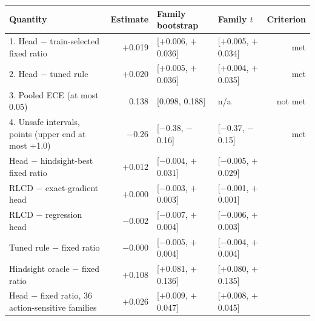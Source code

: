 \begin{tabular}{lrllr}
\toprule
Quantity & Estimate & Family bootstrap & Family $t$ & Criterion \\
\midrule
1. Head $-$ train-selected fixed ratio & $+$0.019 & [$+$0.006, $+$0.036] & [$+$0.005, $+$0.034] & met \\
2. Head $-$ tuned rule & $+$0.020 & [$+$0.005, $+$0.036] & [$+$0.004, $+$0.035] & met \\
3. Pooled ECE (at most 0.05) & 0.138 & [0.098, 0.188] & n/a & not met \\
4. Unsafe intervals, points (upper end at most $+$1.0) & $-$0.26 & [$-$0.38, $-$0.16] & [$-$0.37, $-$0.15] & met \\
\midrule
Head $-$ hindsight-best fixed ratio & $+$0.012 & [$-$0.004, $+$0.031] & [$-$0.005, $+$0.029] &  \\
RLCD $-$ exact-gradient head & $+$0.000 & [$-$0.003, $+$0.003] & [$-$0.001, $+$0.001] &  \\
RLCD $-$ regression head & $-$0.002 & [$-$0.007, $+$0.004] & [$-$0.006, $+$0.003] &  \\
Tuned rule $-$ fixed ratio & $-$0.000 & [$-$0.005, $+$0.004] & [$-$0.004, $+$0.004] &  \\
Hindsight oracle $-$ fixed ratio & $+$0.108 & [$+$0.081, $+$0.136] & [$+$0.080, $+$0.135] &  \\
Head $-$ fixed ratio, 36 action-sensitive families & $+$0.026 & [$+$0.009, $+$0.047] & [$+$0.008, $+$0.045] &  \\
\bottomrule
\end{tabular}
